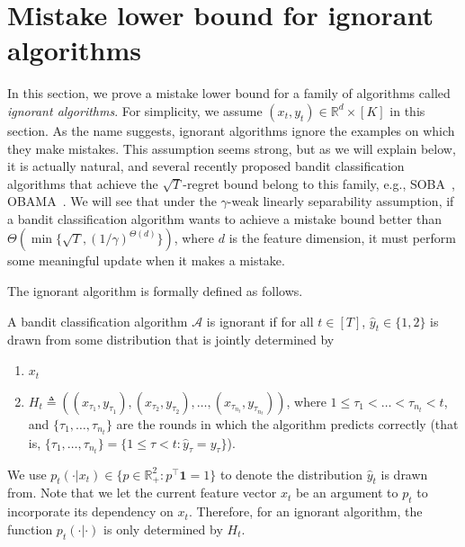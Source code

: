 \section{Mistake lower bound for ignorant algorithms}
In this section, we prove a mistake lower bound for a family of algorithms called \textit{ignorant algorithms}. 
For simplicity, we assume $(x_t, y_t)\in\mathbb{R}^{d}\times [K]$ in this section. 
As the name suggests, ignorant algorithms ignore the examples on which they make mistakes. 
This assumption seems strong, but as we will explain below, it is actually natural, 
and several recently proposed bandit classification algorithms that achieve the $\sqrt{T}$-regret bound belong to this family, e.g., SOBA~\citep{Beygelzimer-Orabona-Zhang-2017}, OBAMA~\citep{Foster-Kale-Luo-Mohri-Sridharan-2018}. 
We will see that under the $\gamma$-weak linearly separability assumption, 
if a bandit classification algorithm wants to achieve a mistake bound better than $\Theta\left(\min\{\sqrt{T}, (1/\gamma)^{\Theta(d)}\}\right)$, where $d$ is the feature dimension, it must perform some meaningful update when it makes a mistake. 

The ignorant algorithm is formally defined as follows.  
\begin{definition} \label{definition:ignorant-algorithm}
    A bandit classification algorithm $\mathcal{A}$ is ignorant if for all $t\in[T]$, 
    $\widehat y_t\in \{1,2\}$ is drawn from some distribution that is jointly determined by 
    \begin{enumerate}
        \item $x_t$
        \item $H_t\triangleq \left( (x_{\tau_1}, y_{\tau_1}), (x_{\tau_2}, y_{\tau_2}), \ldots, (x_{\tau_{n_t}}, y_{\tau_{n_t}}) \right)$, 
        where $1 \leq \tau_1<\ldots <\tau_{n_t} < t$, and $\{\tau_1, \ldots, \tau_{n_t}\}$ 
        are the rounds in which the algorithm predicts correctly (that is, 
        $\{\tau_1, \ldots, \tau_{n_t}\} = \{1\leq \tau<t: \widehat y_\tau=y_\tau\}$). 
    \end{enumerate}
    We use $p_t(\cdot|x_t)\in \{p\in \mathbb{R}_+^2: p^\top\mathbf{1}=1\}$ to denote the distribution $\widehat y_t$ is drawn from. Note that we let the current feature vector $x_t$ be an argument to $p_t$ to incorporate its dependency on $x_t$. Therefore, for an ignorant algorithm, the function $p_t(\cdot|\cdot)$ is only determined by $H_t$. 
\end{definition}

